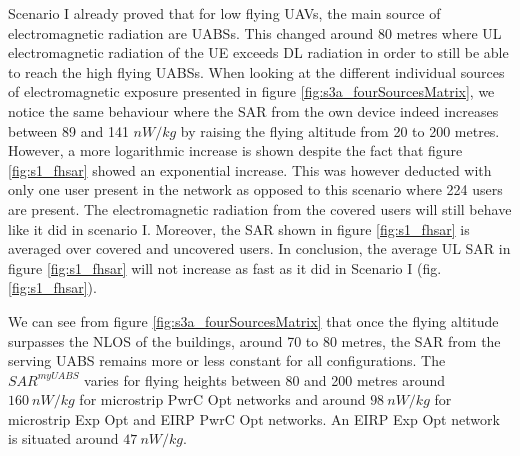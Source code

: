 Scenario I already proved that for low flying \gls{UAV}s, the main source of electromagnetic radiation are \gls{UABS}s. 
This changed around 80 metres where \gls{UL} electromagnetic radiation of the \gls{UE}
exceeds \gls{DL} radiation in order to still be able to reach the high flying \gls{UABS}s. 
When looking at the different individual sources of electromagnetic exposure presented in figure \ref{fig:s3a_fourSourcesMatrix}, 
we notice the same behaviour where the 
 \gls{SAR} from the own device indeed increases between 89 and 141 $nW/kg$ by raising the flying altitude from 
 20 to 200 metres.
  However, a more logarithmic increase is shown
  despite the fact that figure \ref{fig:s1_fhsar} showed an exponential increase.
This was however deducted with only one user present in the network as opposed to this scenario 
where 224 users are present. 
The electromagnetic radiation from the covered users will still behave like it did in scenario I.
Moreover, the \gls{SAR} shown in figure  \ref{fig:s1_fhsar} is averaged  over covered and uncovered users.
In conclusion, the average  \gls{UL} \gls{SAR} in  figure \ref{fig:s1_fhsar} will not increase as fast as it did
in Scenario I (fig. \ref{fig:s1_fhsar}).

We can see from figure \ref{fig:s3a_fourSourcesMatrix} that once the flying altitude surpasses the \gls{NLOS} of the buildings, 
around 70 to 80 metres, the SAR from the serving \gls{UABS} remains 
more or less constant for all configurations.
The $SAR^{myUABS}$ varies for flying heights between 80 and 200 metres
around $160\ nW/kg$ for microstrip \gls{PwrC Opt} networks and around $98\ nW/kg$ for microstrip \gls{Exp Opt} and \gls{EIRP} \gls{PwrC Opt} networks.
An \gls{EIRP} \gls{Exp Opt} network is situated around $47\ nW/kg$.

